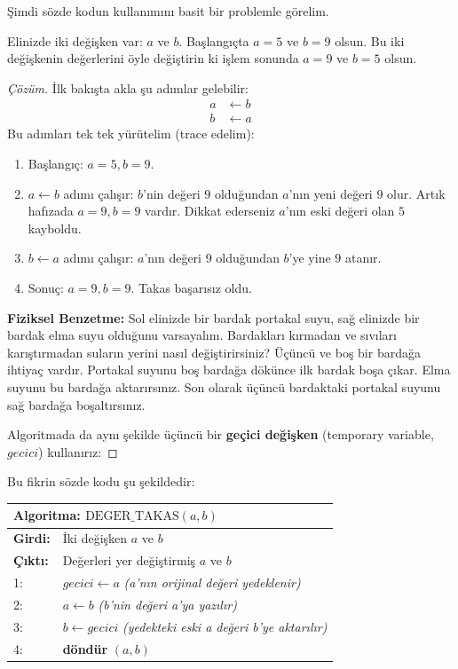 Şimdi sözde kodun kullanımını basit bir problemle görelim.

\begin{example}
Elinizde iki değişken var: $a$ ve $b$. Başlangıçta $a = 5$ ve $b = 9$ olsun. Bu iki değişkenin değerlerini öyle değiştirin ki işlem sonunda $a = 9$ ve $b = 5$ olsun.
\end{example}

\begin{proof}[Çözüm]
İlk bakışta akla şu adımlar gelebilir:
\begin{align*}
    a &\leftarrow b \\
    b &\leftarrow a
\end{align*}
Bu adımları tek tek yürütelim (trace edelim):
\begin{enumerate}
    \item Başlangıç: $a = 5, b = 9$.
    \item $a \leftarrow b$ adımı çalışır: $b$'nin değeri $9$ olduğundan $a$'nın yeni değeri $9$ olur. Artık hafızada $a = 9, b = 9$ vardır. Dikkat ederseniz $a$'nın eski değeri olan $5$ kayboldu.
    \item $b \leftarrow a$ adımı çalışır: $a$'nın değeri $9$ olduğundan $b$'ye yine $9$ atanır.
    \item Sonuç: $a = 9, b = 9$. Takas başarısız oldu.
\end{enumerate}

\textbf{Fiziksel Benzetme:} Sol elinizde bir bardak portakal suyu, sağ elinizde bir bardak elma suyu olduğunu varsayalım. Bardakları kırmadan ve sıvıları karıştırmadan suların yerini nasıl değiştirirsiniz? Üçüncü ve boş bir bardağa ihtiyaç vardır. Portakal suyunu boş bardağa dökünce ilk bardak boşa çıkar. Elma suyunu bu bardağa aktarırsınız. Son olarak üçüncü bardaktaki portakal suyunu sağ bardağa boşaltırsınız.

Algoritmada da aynı şekilde üçüncü bir \textbf{geçici değişken} (temporary variable, $gecici$) kullanırız:
\end{proof}

Bu fikrin sözde kodu şu şekildedir:

\begin{center}
\begin{minipage}{1.0\textwidth}
\begin{tabular}{p{2.4cm}p{9.4cm}}
\hline
\multicolumn{2}{l}{\textbf{Algoritma:} $\text{DEGER\_TAKAS}(a, b)$} \\
\hline
\textbf{Girdi:} & İki değişken $a$ ve $b$ \\
\textbf{Çıktı:} & Değerleri yer değiştirmiş $a$ ve $b$ \\
1: & $gecici \leftarrow a$ \quad \textit{(a'nın orijinal değeri yedeklenir)} \\
2: & $a \leftarrow b$ \quad \textit{(b'nin değeri a'ya yazılır)} \\
3: & $b \leftarrow gecici$ \quad \textit{(yedekteki eski a değeri b'ye aktarılır)} \\
4: & \textbf{döndür} $(a, b)$ \\
\hline
\end{tabular}
\end{minipage}
\end{center}

